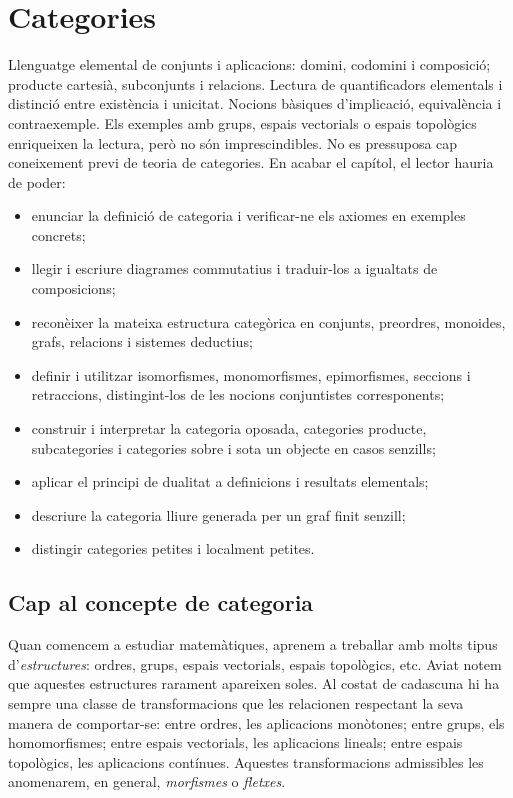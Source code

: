 \chapter{Categories}
\label{cap:categories}

\begin{objectius}
 Llenguatge elemental de conjunts i aplicacions: domini, codomini i composició; producte cartesià, subconjunts i relacions. Lectura de quantificadors elementals i distinció entre existència i unicitat. Nocions bàsiques d'implicació, equivalència i contraexemple. Els exemples amb grups, espais vectorials o espais topològics enriqueixen la lectura, però no són imprescindibles. No es pressuposa cap coneixement previ de teoria de categories.
 En acabar el capítol, el lector hauria de poder:
\begin{itemize}
  \item enunciar la definició de categoria i verificar-ne els axiomes en exemples concrets;
  \item llegir i escriure diagrames commutatius i traduir-los a igualtats de composicions;
  \item reconèixer la mateixa estructura categòrica en conjunts, preordres, monoides, grafs, relacions i sistemes deductius;
  \item definir i utilitzar isomorfismes, monomorfismes, epimorfismes, seccions i retraccions, distingint-los de les nocions conjuntistes corresponents;
  \item construir i interpretar la categoria oposada, categories producte, subcategories i categories sobre i sota un objecte en casos senzills;
  \item aplicar el principi de dualitat a definicions i resultats elementals;
  \item descriure la categoria lliure generada per un graf finit senzill;
  \item distingir categories petites i localment petites.
\end{itemize}
\end{objectius}

\section{Cap al concepte de categoria}

Quan comencem a estudiar matemàtiques, aprenem a treballar amb molts tipus d'\emph{estructures}: ordres, grups, espais vectorials, espais topològics, etc. Aviat notem que aquestes estructures rarament apareixen soles. Al costat de cadascuna hi ha sempre una classe de transformacions que les relacionen respectant la seva manera de comportar-se: entre ordres, les aplicacions monòtones; entre grups, els homomorfismes; entre espais vectorials, les aplicacions lineals; entre espais topològics, les aplicacions contínues. Aquestes transformacions admissibles les anomenarem, en general, \emph{morfismes} o \emph{fletxes}.

